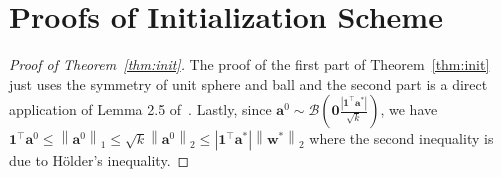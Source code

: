 \documentclass{article}
\newcommand{\firstlayer}{w}
\newcommand{\secondlayer}{a}
\newcommand{\vect}[1]{\mathbf{#1}}
\newcommand{\norm}[1]{\left\|#1\right\|}
\newcommand{\abs}[1]{\left|#1\right|}
\begin{document}
\section{Proofs of Initialization Scheme}
\label{sec:proof_init}
\begin{proof}[Proof of Theorem~\ref{thm:init}]
The proof of the first part of Theorem~\ref{thm:init} just uses the symmetry of unit sphere and ball and the second part is a direct application of Lemma 2.5 of~\citep{hardt2014noisy}.
Lastly, since $\vect{\secondlayer}^0 \sim \mathcal{B}\left(\vect{0}\frac{\abs{\vect{1}^\top \vect{\secondlayer}^*}}{\sqrt{k}}\right)$,  we have $\vect{1}^\top \vect{\secondlayer}^0 \le \norm{\vect{\secondlayer}^0}_1 \le  \sqrt{k}\norm{\vect{\secondlayer}^0}_2 \le \abs{\vect{1}^\top \vect{\secondlayer}^*}\norm{\vect{\firstlayer}^*}_2$ where the second inequality is due to H\"{o}lder's inequality.
\end{proof}
\end{document}
